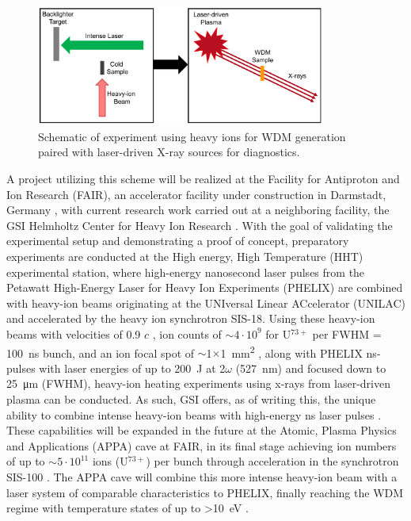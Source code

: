 \begin{figure}[H]
	\centering
	\includegraphics[width=0.85\textwidth]{Diagrams/HIHEX.pdf}
	\caption{Schematic of experiment using heavy ions for WDM generation paired with laser-driven X-ray sources for diagnostics.}
	\label{fig: HIHEX scheme}
\end{figure}

A project utilizing this scheme will be realized at the Facility for Antiproton and 
Ion Research (FAIR), an accelerator facility under 
construction in Darmstadt, Germany 
\cite{schoenberg2020high}, with current research work carried out at a 
neighboring facility, the GSI 
Helmholtz Center for Heavy Ion Research 
\citep{bagnoud2010commissioning}. With the goal of validating the experimental setup and demonstrating a proof of concept, preparatory experiments are conducted at the High energy, High 
Temperature (HHT) experimental station, where high-energy nanosecond laser pulses
from the Petawatt 
High-Energy Laser for Heavy Ion Experiments (PHELIX) 
are combined with heavy-ion beams originating at the 
UNIversal Linear ACcelerator (UNILAC) and accelerated 
by the heavy ion synchrotron SIS-18. Using these 
heavy-ion beams with velocities of 0.9 $c$
\cite{GSI_2023}, ion counts of $\sim 4\cdot 10^9$ 
for U$^{73+}$ per FWHM = \SI{100}{\nano\second} 
bunch, and an ion focal spot of 
$\sim$1$\times$\SI{1}{\milli\meter\squared}
\citep{GSI_2023_ion_num}, along with PHELIX ns-pulses 
with laser energies of up to 
\SI{200}{\joule} at 2$\omega$ (\SI{527}{\nano\meter}) and focused down to \SI{25}{\micro\meter} (FWHM), 
heavy-ion heating experiments using x-rays from 
laser-driven plasma can be conducted. As such, GSI 
offers, as of writing this, the
unique ability to combine intense heavy-ion beams 
with high-energy ns laser pulses 
\citep{hoffmann2006frontiers}. These capabilities 
will be expanded in the 
future at the Atomic, Plasma Physics and Applications 
(APPA) cave at FAIR, in its final stage achieving ion 
numbers of up to $\sim 5\cdot10^{11}$ ions 
(U$^{73+}$) per bunch through acceleration in the 
synchrotron SIS-100 \citep{schoenberg2020high}. The 
APPA cave will combine this more 
intense heavy-ion beam with a laser system of 
comparable characteristics to PHELIX, finally 
reaching the WDM regime with temperature states of up 
to >\SI{10}{\electronvolt}
\citep{schoenberg2020high}. 

